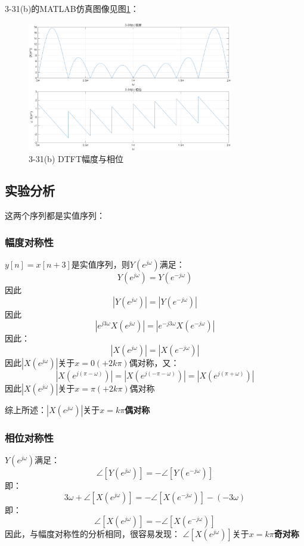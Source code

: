\documentclass[UTF8,12pt,a4paper]{ctexart}
\begin{document}
3-31(b)的MATLAB仿真图像见图\ref{fig:3-31b}：

\begin{figure}[htbp]
    \centering
    \includegraphics[width=0.8\textwidth]{3-31(b).png}
    \caption{3-31(b) DTFT幅度与相位}
    \label{fig:3-31b}
\end{figure}

\subsection{实验分析}

这两个序列都是实值序列：

\subsubsection{幅度对称性}

$y[n]=x[n+3]$是实值序列，则$Y(e^{j\omega})$满足：
$$Y(e^{j\omega})=Y(e^{-j\omega})$$
因此$$|Y(e^{j\omega})|=|Y(e^{-j\omega})|$$
因此$$|e^{j3\omega}X(e^{j\omega})|=|e^{-j3\omega}X(e^{-j\omega})|$$
因此：$$|X(e^{j\omega})|=|X(e^{-j\omega})|$$
因此$|X(e^{j\omega})|$关于$x=0(+2k\pi)$偶对称，又：
$$|X(e^{j(\pi-\omega)})|=|X(e^{j(-\pi-\omega)})|=|X(e^{j(\pi+\omega)})|$$
因此$|X(e^{j\omega})|$关于$x=\pi(+2k\pi)$偶对称

综上所述：$|X(e^{j\omega})|$关于$x=k\pi$\textbf{偶对称}

\subsubsection{相位对称性}

$Y(e^{j\omega})$满足：
$$\angle [Y(e^{j\omega})]=-\angle [Y(e^{-j\omega})]$$
即：
$$ 3\omega + \angle[X(e^{j\omega})]=-\angle[X(e^{-j\omega})]-(-3\omega)$$
即：
$$\angle [X(e^{j\omega})]=-\angle [X(e^{-j\omega})]$$
因此，与幅度对称性的分析相同，很容易发现：
$\angle[X(e^{j\omega})]$关于$x=k\pi$\textbf{奇对称}
\end{document}
